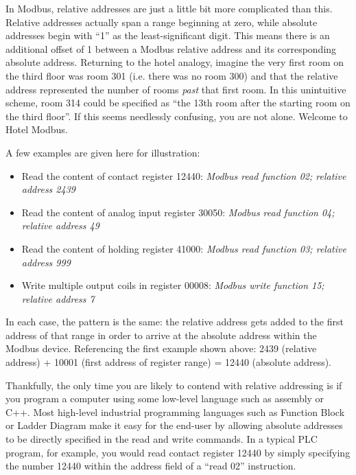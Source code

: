 In Modbus, relative addresses are just a little bit more complicated than this.  Relative addresses actually span a range beginning at zero, while absolute addresses begin with ``1'' as the least-significant digit.  This means there is an additional offset of 1 between a Modbus relative address and its corresponding absolute address.  Returning to the hotel analogy, imagine the very first room on the third floor was room 301 (i.e. there was no room 300) and that the relative address represented the number of rooms \textit{past} that first room.  In this unintuitive scheme, room 314 could be specified as ``the 13th room after the starting room on the third floor''.  If this seems needlessly confusing, you are not alone.  Welcome to Hotel Modbus.

\vskip 10pt

A few examples are given here for illustration:

\begin{itemize}
\item Read the content of contact register 12440: \textit{Modbus read function 02; relative address 2439}
\item Read the content of analog input register 30050: \textit{Modbus read function 04; relative address 49}
\item Read the content of holding register 41000: \textit{Modbus read function 03; relative address 999}
\item Write multiple output coils in register 00008: \textit{Modbus write function 15; relative address 7} 
\end{itemize}

In each case, the pattern is the same: the relative address gets added to the first address of that range in order to arrive at the absolute address within the Modbus device.  Referencing the first example shown above: 2439 (relative address) + 10001 (first address of register range) = 12440 (absolute address).

Thankfully, the only time you are likely to contend with relative addressing is if you program a computer using some low-level language such as assembly or C++.  Most high-level industrial programming languages such as Function Block or Ladder Diagram make it easy for the end-user by allowing absolute addresses to be directly specified in the read and write commands.  In a typical PLC program, for example, you would read contact register 12440 by simply specifying the number 12440 within the address field of a ``read 02'' instruction.

